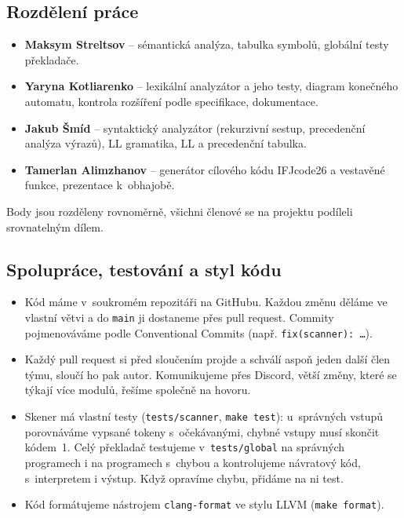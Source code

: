 \documentclass[11pt,a4paper]{article}
\begin{document}
\subsection{Rozdělení práce}
\begin{itemize}
 \item \textbf{Maksym Streltsov} -- sémantická analýza, tabulka symbolů,
        globální testy překladače.
  \item \textbf{Yaryna Kotliarenko} -- lexikální analyzátor a jeho testy,
        diagram konečného automatu, kontrola rozšíření podle specifikace,
        dokumentace.
  \item \textbf{Jakub Šmíd} -- syntaktický analyzátor (rekurzivní sestup,
        precedenční analýza výrazů), LL gramatika, LL a precedenční tabulka.
  \item \textbf{Tamerlan Alimzhanov} -- generátor cílového kódu IFJcode26
        a vestavěné funkce, prezentace k~obhajobě.
\end{itemize}
Body jsou rozděleny rovnoměrně, všichni členové se na projektu podíleli
srovnatelným dílem.


\subsection{Spolupráce, testování a styl kódu}
\begin{itemize}
  \item Kód máme v~soukromém repozitáři na GitHubu. Každou změnu děláme
        ve vlastní větvi a do \texttt{main} ji dostaneme přes pull request.
        Commity pojmenováváme podle Conventional Commits
        (např. \texttt{fix(scanner): \dots}).
  \item Každý pull request si před sloučením projde a schválí aspoň jeden
        další člen týmu, sloučí ho pak autor. Komunikujeme přes Discord,
        větší změny, které se týkají více modulů, řešíme společně na hovoru.
  \item Skener má vlastní testy (\texttt{tests/scanner}, \texttt{make test}):
        u~správných vstupů porovnáváme vypsané tokeny s~očekávanými,
        chybné vstupy musí skončit kódem~1. Celý překladač testujeme
        v~\texttt{tests/global} na správných programech i na programech
        s~chybou a kontrolujeme návratový kód, s~interpretem i výstup.
        Když opravíme chybu, přidáme na ni test.
  \item Kód formátujeme nástrojem \texttt{clang-format} ve stylu LLVM
        (\texttt{make format}).
\end{itemize}
\end{document}
